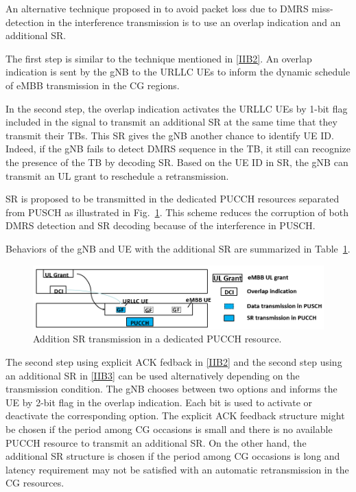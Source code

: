 \documentclass{ieeeaccess}
\begin{document}
\begin{table}[htbp]
\begin{center}
\begin{tabular}{|p{1.5em}|p{10em}|p{9em}|p{16em}|p{9em}|p{9em}|}
 
 \hline
\end{tabular}
\label{tab2}
\end{center}

\end{table}

An alternative technique proposed in \cite{ad99} to avoid packet loss due to DMRS miss-detection in the interference transmission is to use an overlap indication and an additional SR.

The first step is similar to the technique mentioned in \ref{IIB2}. An overlap indication is sent by the gNB to the URLLC UEs to inform the dynamic schedule of eMBB transmission in the CG regions.

In the second step, the overlap indication activates the URLLC UEs by 1-bit flag included in the signal to transmit an additional SR at the same time that they transmit their TBs. This SR gives the gNB another chance to identify UE ID. Indeed, if the gNB fails to detect DMRS sequence in the TB, it still can recognize the presence of the TB by decoding SR. Based on the UE ID in SR, the gNB can transmit an UL grant to reschedule a retransmission.

SR is proposed to be transmitted in the dedicated PUCCH resources separated from PUSCH as illustrated in Fig.~\ref{fig3}. This scheme reduces the corruption of both DMRS detection and SR decoding because of the interference in PUSCH.

Behaviors of the gNB and UE with the additional SR are summarized in Table~\ref{tab2}.

\begin{figure}[htbp]
\centerline{\includegraphics[scale=0.33]{fig3.PNG}}
\caption{Addition SR transmission in a dedicated PUCCH resource.}
\label{fig3}
\vspace{-2mm}
\end{figure}


The second step using explicit ACK fedback in \ref{IIB2} and the second step using an additional SR in \ref{IIB3} can be used alternatively depending on the transmission condition. The gNB chooses between two options and informs the UE by 2-bit flag in the overlap indication. Each bit is used to activate or deactivate the corresponding option. The explicit ACK feedback structure might be chosen if the period among CG occasions is small and there is no available PUCCH resource to transmit an additional SR. On the other hand, the additional SR structure is chosen if the period among CG occasions is long and latency requirement may not be satisfied with an automatic retransmission in the CG resources. 
\end{document}

